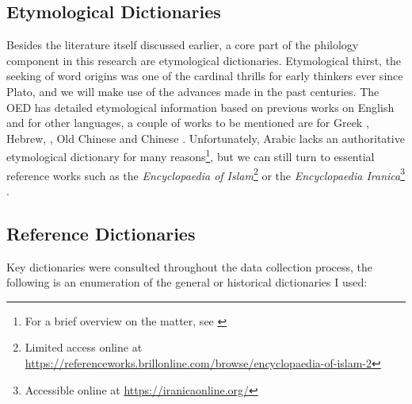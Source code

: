 \subsection{Etymological Dictionaries}

Besides the literature itself discussed earlier, a core part of the philology component in this research are etymological dictionaries. Etymological thirst, the seeking of word origins was one of the cardinal thrills for early thinkers ever since Plato, and we will make use of the advances made in the past centuries. The \gls{OED} has detailed etymological information based on previous works on English and for other languages, a couple of works to be mentioned are for Greek \textcite{beekes_etymological_2010}, Hebrew, \textcite{klein_comprehensive_1987}, Old Chinese \textcite{schuessler_abc_2007} and Chinese \textcite{liu__1985}. Unfortunately, Arabic lacks an authoritative etymological dictionary for many reasons\footnote{For a brief overview on the matter, see \textcite{blazek_etymology_2006}}, but we can still turn to essential reference works such as the \textit{Encyclopaedia of Islam}\footnote{Limited access online at \url{https://referenceworks.brillonline.com/browse/encyclopaedia-of-islam-2}} \autocite{ei2} or the \textit{Encyclopaedia Iranica}\footnote{Accessible online at \url{https://iranicaonline.org/}} \autocite{eir}. 



\subsection{Reference Dictionaries}

Key dictionaries were consulted throughout the data collection process, the following is an enumeration of the general or historical dictionaries I used: 





